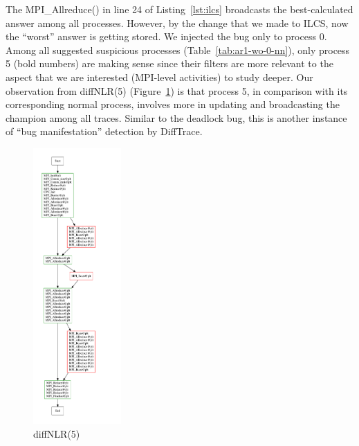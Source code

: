 The MPI\_Allreduce() in line 24 of Listing~\ref{lst:ilcs} broadcasts the best-calculated answer among all processes.
%
However, by the change that we made to ILCS, now the ``worst'' answer is getting stored.
%
We injected the bug only to process 0.
%
Among all suggested suspicious processes (Table~\ref{tab:ar1-wo-0-nn}), only process 5 (bold numbers) are making sense since their filters are more relevant to the aspect that we are interested (MPI-level activities) to study deeper.
%
Our observation from diffNLR(5) (Figure~\ref{diffNLR-5}) is that process 5, in comparison with its corresponding normal process, involves more in updating and broadcasting the champion among all traces.
%
Similar to the deadlock bug, this is another instance of  ``bug manifestation'' detection by DiffTrace.



\begin{figure}[]
\centering
\includegraphics[width=0.3\textwidth]{figs/diffNLR/mpiBug2-0-nn.pdf}
\caption{diffNLR(5)}
\label{diffNLR-5}
\end{figure}



